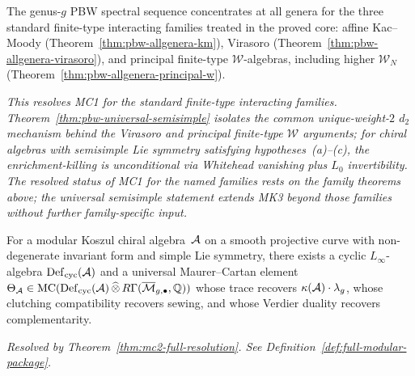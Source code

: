 \begin{theorem}\label{thm:master-pbw}
\ClaimStatusProvedHere{}
The genus-$g$ PBW spectral sequence concentrates at all genera for the
three standard finite-type interacting families treated in the proved
core: affine Kac--Moody
\textup{(}Theorem~\textup{\ref{thm:pbw-allgenera-km}}\textup{)},
Virasoro
\textup{(}Theorem~\textup{\ref{thm:pbw-allgenera-virasoro}}\textup{)},
and principal finite-type $\mathcal{W}$-algebras, including higher
$\mathcal{W}_N$
\textup{(}Theorem~\textup{\ref{thm:pbw-allgenera-principal-w}}\textup{)}.

\emph{This resolves MC1 for the standard finite-type interacting
families.  Theorem~\textup{\ref{thm:pbw-universal-semisimple}}
isolates the common unique-weight-$2$ $d_2$ mechanism behind the
Virasoro and principal finite-type $\mathcal{W}$ arguments; for chiral
algebras with semisimple Lie symmetry satisfying
hypotheses~\textup{(a)--(c)}, the enrichment-killing is unconditional
via Whitehead vanishing plus $L_0$ invertibility.  The resolved status
of MC1 for the named families rests on the family theorems above;
the universal semisimple statement extends MK3 beyond those families
without further family-specific input.}
\end{theorem}

\begin{theorem}%
\label{thm:master-theta}
\ClaimStatusProvedHere{}
For a modular Koszul chiral algebra~$\mathcal{A}$ on a smooth projective
curve with non-degenerate invariant form and simple Lie symmetry,
there exists a cyclic
$L_\infty$-algebra $\operatorname{Def}_{\mathrm{cyc}}(\mathcal{A})$ and a
universal Maurer--Cartan element
$\Theta_{\mathcal{A}} \in \operatorname{MC}(
  \operatorname{Def}_{\mathrm{cyc}}(\mathcal{A}) \,\widehat{\otimes}\,
  R\Gamma(\overline{\mathcal{M}}_{g,\bullet}, \mathbb{Q}))$
whose trace recovers $\kappa(\mathcal{A}) \cdot \lambda_g$, whose clutching
compatibility recovers sewing, and whose Verdier duality
recovers complementarity.

\emph{Resolved by
Theorem~\textup{\ref{thm:mc2-full-resolution}}.
See Definition~\textup{\ref{def:full-modular-package}}.}
\end{theorem}


